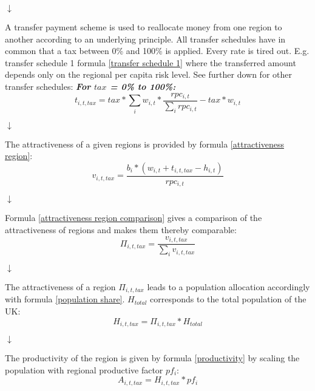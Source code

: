 \documentclass[10pt,a4]{article}
\begin{document}
\begin{center}
\begin{center}
    $\downarrow$
\end{center}
A transfer payment scheme is used to reallocate money from one region to another according to an underlying principle. All transfer schedules have in common that a tax between 0\% and 100\% is applied. Every rate is tired out. E.g. transfer schedule 1 formula \ref{transfer schedule 1} where the transferred amount depends only on the regional per capita risk level. See further down for other transfer schedules:
\newline
\newline
\textbf{\textit{For $tax$ = 0\% to 100\%:}}
\begin{equation}
    t_{i,t,tax} = tax * \sum_i w_{i,t} * \frac{rpc_{i,t}}{\sum_i rpc_{i,t}} - tax * w_{i,t}
    \label{transfer schedule 1}
\end{equation}

\begin{center}
    $\downarrow$
\end{center}
The attractiveness of a given regions is provided by formula \ref{attractiveness region}: 
\begin{equation}
    v_{i,t,tax} = \frac{b_i*(w_{i,t}+t_{i,t,tax}-h_{i,t})}{rpc_{i,t}}
    \label{attractiveness region}
\end{equation}

\begin{center}
    $\downarrow$
\end{center}
Formula \ref{attractiveness region comparison} gives a comparison of the attractiveness of regions and makes them thereby comparable:
\begin{equation}
    \Pi_{i,t,tax} = \frac{v_{i,t,tax}}{\sum_i v_{i,t,tax}}
    \label{attractiveness region comparison}
\end{equation}

\begin{center}
    $\downarrow$
\end{center}
The attractiveness of a region $\Pi_{i,t,tax}$ leads to a population allocation accordingly with formula \ref{population share}. $H_{total}$ corresponds to the total population of the UK:
\begin{equation}
    H_{i,t,tax} = \Pi_{i,t,tax} * H_{total}
    \label{population share}
\end{equation}

\begin{center}
    $\downarrow$
\end{center}
The productivity of the region is given by formula \ref{productivity} by scaling the population with regional productive factor $pf_i$:
\begin{equation}
    A_{i,t,tax} = H_{i,t,tax} * pf_i
    \label{productivity}
\end{equation}


\end{center}
\end{document}
